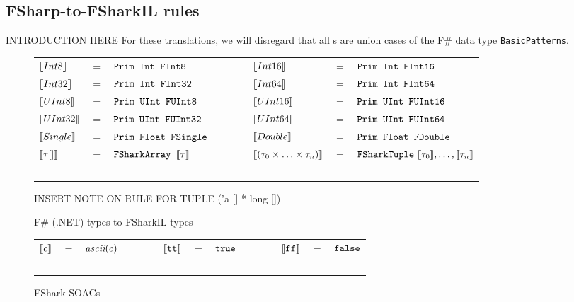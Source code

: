 \subsection{FSharp-to-FSharkIL rules}
INTRODUCTION HERE
For these translations, we will disregard that all \fsharpexpr{}s are union
cases of the F\# data type \texttt{BasicPatterns}.

\begin{figure}
  \centering
\begin{tabular}{@{}l c l c l c l}%
  $\llbracket Int8 \rrbracket$ & $=$ & $\text{\ttfamily Prim Int FInt8} $ & ~~~~~ & 
  $\llbracket Int16 \rrbracket$ & $=$ & $\text{\ttfamily Prim Int FInt16}$
  \\
  $\llbracket Int32 \rrbracket$ & $=$ & $\text{\ttfamily Prim Int FInt32} $ & ~~~~~ & 
  $\llbracket Int64 \rrbracket$ & $=$ & $\text{\ttfamily Prim Int FInt64} $
  \\
  $\llbracket UInt8 \rrbracket$ & $=$ & $\text{\ttfamily Prim UInt FUInt8} $ & ~~~~~ & 
  $\llbracket UInt16 \rrbracket$ & $=$ & $\text{\ttfamily Prim UInt FUInt16} $ 
  \\
  $\llbracket UInt32 \rrbracket$ & $=$ & $\text{\ttfamily Prim UInt FUInt32} $ & ~~~~~ & 
  $\llbracket UInt64 \rrbracket$ & $=$ & $\text{\ttfamily Prim UInt FUInt64} $ 
  \\
  $\llbracket Single \rrbracket$ & $=$ & $\text{\ttfamily Prim Float FSingle} $ & ~~~~~ & 
  $\llbracket Double \rrbracket$ & $=$ & $\text{\ttfamily Prim Float FDouble} $ 
  \\
  $\llbracket \tau [] \rrbracket$ & $=$ & $\text{\ttfamily FSharkArray }\llbracket \tau \rrbracket$ & ~~~~~ & 
  $\llbracket (\tau_0 \times \ldots \times \tau_n) \rrbracket$ & $=$ & $\text{\ttfamily FSharkTuple}~\llbracket \tau_0 \rrbracket,\ldots,\llbracket \tau_n \rrbracket$ \\ ~ \\
\end{tabular}

INSERT NOTE ON RULE FOR TUPLE ('a [] * long [])

\caption{F\# (.NET) types to FSharkIL types}
\end{figure}


\begin{figure}
  \centering
  \begin{tabular}{@{}l c l c l c l c l c l}%
  $\llbracket c \rrbracket$ & $=$ & $\emph{ascii}(c)$ & ~~~~~ & 
  $\llbracket \text{\ttfamily tt} \rrbracket$ & $=$ & $\text{\ttfamily true}$ & ~~~~~ & 
  $\llbracket \text{\ttfamily ff} \rrbracket$ & $=$ & $\text{\ttfamily false}$ \\ ~ \\
\end{tabular}
  \caption{FShark SOACs}
\end{figure}





